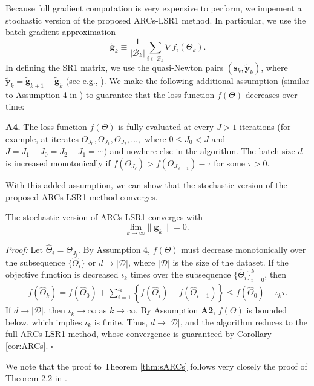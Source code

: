 \noindent 
Because full gradient computation is very expensive to perform, we impement a stochastic version 
of the proposed ARCs-LSR1 method.  In particular, we use the batch gradient approximation
$$
	\tilde{\mathbf{g}}_k \equiv \frac{1}{| \mathcal{B}_k |} \sum_{i \in \mathcal{B}_k} \nabla f_i (\Theta_k).
$$
In defining the SR1 matrix, we use the quasi-Newton pairs $(\mathbf{s}_k, \tilde{\mathbf{y}}_k)$,
where $\tilde{\mathbf{y}}_k = \tilde{\mathbf{g}}_{k+1} - \tilde{\mathbf{g}}_k$ (see e.g., \cite{Erway2020TrustregionAF}).
We make the following additional assumption (similar to Assumption 4 in  \cite{Erway2020TrustregionAF}) to guarantee that the loss function $f(\Theta)$ decreases over time:

\medskip

\noindent
\textbf{A4.} The loss function $f(\Theta)$ is fully evaluated at every $J > 1$ iterations (for example, 
at iterates $\Theta_{J_0}, \Theta_{J_1}, \Theta_{J_2}, \dots,$ where $0 \le J_0 < J$ and
$J = J_1 - J_0 = J_2 - J_1 = \cdots $) and nowhere else in the algorithm.  The batch size $d$ is increased 
monotonically if $f(\Theta_{J_{\ell}}) > f(\Theta_{J_{\ell - 1}}) - \tau$ for some $\tau > 0$.

\medskip

\noindent 
With this added assumption, we can show that the stochastic version of the proposed ARCs-LSR1 method converges.

\begin{theorem}\label{thm:sARCs}
	The stochastic version of ARCs-LSR1 converges with  
	$$\underset{k \to \infty}{\text{lim}} \|\mathbf{g}_k\| = 0.$$
\end{theorem}

\textit{Proof:} Let $\widehat{\Theta}_i = \Theta_{J_i}$.  By Assumption 4, $f(\Theta)$ must 
decrease monotonically over the subsequence $\{ \widehat{\Theta}_i \}$ or $d \rightarrow |\mathcal{D}|$,
where $|\mathcal{D}|$ is the size of the dataset.    If the objective function is decreased 
$\iota_k$ times over the subsequence $ \{ \widehat{\Theta}_i\}_{i=0}^k$, then
\begin{eqnarray*}
	f(\widehat{\Theta}_k) = f(\hat{\Theta}_0)  + \sum_{i=1}^{\iota_k}
	\left \{
		f(\widehat{\Theta}_i)  -  f(\widehat{\Theta}_{i-1})
	\right \} \le  f(\widehat{\Theta}_0) - \iota_k \tau.
\end{eqnarray*}
If $d \rightarrow |\mathcal{D}|$, then $\iota_k \rightarrow \infty$ as $k \rightarrow \infty$.
By Assumption \textbf{A2}, $f(\Theta)$ is bounded below, which implies $\iota_k$ is finite.  
Thus, $d \rightarrow |\mathcal{D}|$, and the algorithm reduces to the full ARCs-LSR1 method,
whose convergence is guaranteed by Corollary \ref{cor:ARCs}.  $\square$

\medskip

\noindent 
We note that the proof to Theorem \ref{thm:sARCs} follows very closely the proof of Theorem 2.2 in 
\cite{Erway2020TrustregionAF}.


\medskip